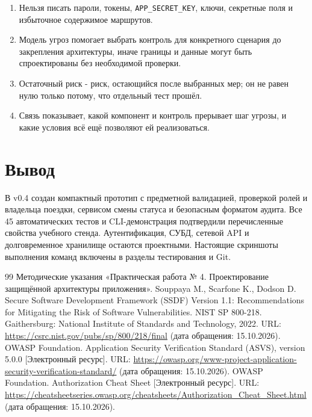 \documentclass[12pt,a4paper]{article}
\begin{document}
\begin{enumerate}
\item Нельзя писать пароли, токены, \texttt{APP\_SECRET\_KEY}, ключи, секретные поля и избыточное содержимое маршрутов.
\item Модель угроз помогает выбрать контроль для конкретного сценария до закрепления архитектуры, иначе границы и данные могут быть спроектированы без необходимой проверки.
\item Остаточный риск - риск, остающийся после выбранных мер; он не равен нулю только потому, что отдельный тест прошёл.
\item Связь показывает, какой компонент и контроль прерывает шаг угрозы, и какие условия всё ещё позволяют ей реализоваться.
\end{enumerate}

\section{Вывод}
В v0.4 создан компактный прототип с предметной валидацией, проверкой ролей и владельца поездки, сервисом смены статуса и безопасным форматом аудита. Все 45 автоматических тестов и CLI-демонстрация подтвердили перечисленные свойства учебного стенда. Аутентификация, СУБД, сетевой API и долговременное хранилище остаются проектными. Настоящие скриншоты выполнения команд включены в разделы тестирования и Git.

\clearpage
\renewcommand{\refname}{Список использованных источников}
\begin{thebibliography}{99}
 Методические указания «Практическая работа № 4. Проектирование защищённой архитектуры приложения».
 Souppaya M., Scarfone K., Dodson D. Secure Software Development Framework (SSDF) Version 1.1: Recommendations for Mitigating the Risk of Software Vulnerabilities. NIST SP 800-218. Gaithersburg: National Institute of Standards and Technology, 2022. URL: \url{https://csrc.nist.gov/pubs/sp/800/218/final} (дата обращения: 15.10.2026).
 \mbox{OWASP} Foundation. Application Security Verification Standard (ASVS), version 5.0.0 [Электронный ресурс]. URL: \url{https://owasp.org/www-project-application-security-verification-standard/} (дата обращения: 15.10.2026).
 \mbox{OWASP} Foundation. Authorization Cheat Sheet [Электронный ресурс]. URL: \url{https://cheatsheetseries.owasp.org/cheatsheets/Authorization_Cheat_Sheet.html} (дата обращения: 15.10.2026).
\end{thebibliography}
\end{document}
